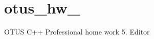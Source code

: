 \chapter{otus\+\_\+hw\+\_}
\hypertarget{md__r_e_a_d_m_e}{}\label{md__r_e_a_d_m_e}
\label{md__r_e_a_d_m_e_autotoc_md0}%
%


OTUS C++ Professional home work 5. Editor 